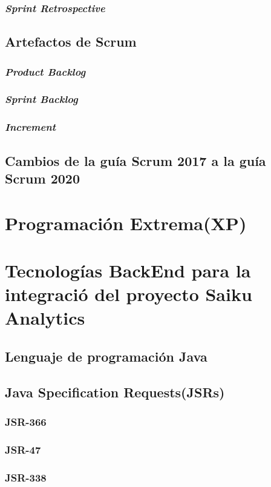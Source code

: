 		\subsubsection{\textit{Sprint Retrospective}}
	\subsection{Artefactos de Scrum}
		\subsubsection{\textit{Product Backlog}}
		\subsubsection{\textit{Sprint Backlog}}
		\subsubsection{\textit{Increment}}
	\subsection{Cambios de la gu\'{i}a Scrum 2017 a la gu\'{i}a Scrum 2020}

\section{Programaci\'{o}n Extrema(XP)}
		\lipsum[1-2]
\section{Tecnolog\'{i}as BackEnd para la integraci\'{o} del proyecto Saiku Analytics}
		\lipsum[1-2]
	\subsection{Lenguaje de programaci\'{o}n Java}
			\lipsum[1-2]
	\subsection{Java Specification Requests(JSRs)}
		\subsubsection{JSR-366}
				\lipsum[1-2]
		\subsubsection{JSR-47}
				\lipsum[1-2]
		\subsubsection{JSR-338}
				\lipsum[1-2]
